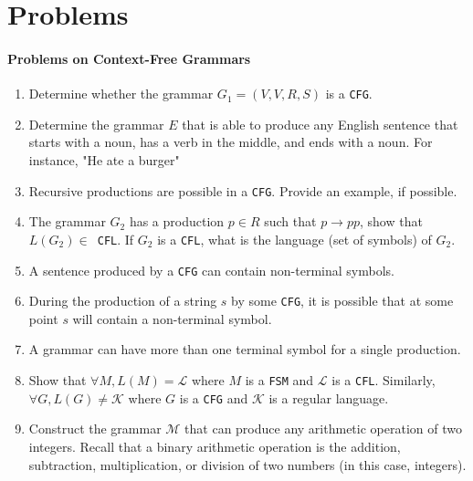 \section{Problems}

\paragraph{Problems on Context-Free Grammars}
\begin{enumerate}
    \item Determine whether the grammar $G_1 = (V,V,R,S)$ is a \texttt{CFG}.
    \item Determine the grammar $E$ that is able to produce any English sentence that starts with a noun, has a verb in the middle, and ends with a noun. For instance, "He ate a burger"
    \item Recursive productions are possible in a \texttt{CFG}. Provide an example, if possible.
    \item The grammar $G_2$ has a production $p\in R$ such that $p\to pp$, show that $L(G_2)\in$\texttt{ CFL}. If $G_2$ is a \texttt{CFL}, what is the language (set of symbols) of $G_2$.
    \item A sentence produced by a \texttt{CFG} can contain non-terminal symbols.
    \item During the production of a string $s$ by some \texttt{CFG}, it is possible that at some point $s$ will contain a non-terminal symbol.
    \item A grammar can have more than one terminal symbol for a single production.
    \item Show that $\forall M, L(M) = \mathcal{L}$ where $M$ is a \texttt{FSM} and $\mathcal{L}$ is a \texttt{CFL}. Similarly, $\forall G, L(G) \neq \mathcal{K}$ where $G$ is a \texttt{CFG} and $\mathcal{K}$ is a regular language.
    \item Construct the grammar $\mathcal{M}$ that can produce any arithmetic operation of two integers. Recall that a binary arithmetic operation is the  addition, subtraction, multiplication, or division of two numbers (in this case, integers).
\end{enumerate}